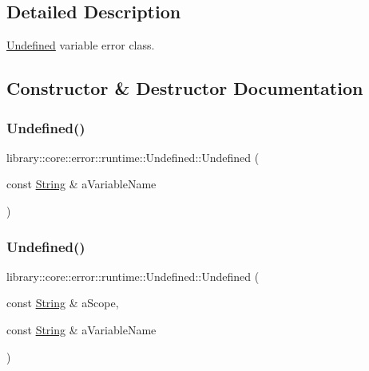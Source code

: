 \subsection{Detailed Description}
\hyperlink{classlibrary_1_1core_1_1error_1_1runtime_1_1_undefined}{Undefined} variable error class. 

\subsection{Constructor \& Destructor Documentation}
\mbox{\label{classlibrary_1_1core_1_1error_1_1runtime_1_1_undefined_a585cecbe505147926980971fed942b95}} 
\subsubsection{\texorpdfstring{Undefined()}{Undefined()}\hspace{0.1cm}{\footnotesize\ttfamily [1/2]}}
{\footnotesize\ttfamily library\+::core\+::error\+::runtime\+::\+Undefined\+::\+Undefined (\begin{DoxyParamCaption}\item[{const \hyperlink{classlibrary_1_1core_1_1types_1_1_string}{String} \&}]{a\+Variable\+Name }\end{DoxyParamCaption})}

\mbox{\label{classlibrary_1_1core_1_1error_1_1runtime_1_1_undefined_a61e341571e36a63bd0894c82b6be7427}} 
\subsubsection{\texorpdfstring{Undefined()}{Undefined()}\hspace{0.1cm}{\footnotesize\ttfamily [2/2]}}
{\footnotesize\ttfamily library\+::core\+::error\+::runtime\+::\+Undefined\+::\+Undefined (\begin{DoxyParamCaption}\item[{const \hyperlink{classlibrary_1_1core_1_1types_1_1_string}{String} \&}]{a\+Scope,  }\item[{const \hyperlink{classlibrary_1_1core_1_1types_1_1_string}{String} \&}]{a\+Variable\+Name }\end{DoxyParamCaption})}


